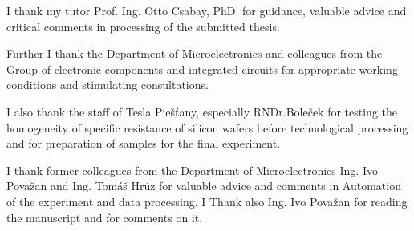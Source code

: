 \iffalse
\par Ďakujem svojmu školiteľovi Prof. Ing. Ottovi Csabayovi, DrSc. za
usmerňovanie, cenné rady a kritické pripomienky pri spracovaní
predloženej kandidátskej práce.
\par Ďakujem ďalej vedeniu Katedry mikroelektroniky a kolegom z
Oddelenia elektronických prvkov a integrovaných obvodov za vytvorené
pracovné podmienky a podnetné konzultácie.
\par Ďakujem tiež pracovníkom Tesly Piešťany, najmä RNDr.Bolečkovi za
otestovanie homogenity špecifického odporu kremíkových dosiek pred
technologickým spracovaním a za prípravu vzoriek pre záverečný
experiment.
\par Ďakujem bývalým pracovníkom Katedry mikroelektroniky
Ing. Ivovi Považanovi a Ing. Tomášovi Hrúzovi za cenné rady a
pripomienky v oblasti automatizácie experimentu a spracovania
dát. Ing.Považanovi ďakujem aj za prečítanie práce a pripomienky k
nej.
\fi

\par
I thank my tutor Prof. Ing. Otto Csabay, PhD. for guidance, valuable
advice and critical comments in processing of the submitted thesis.

\par
Further I thank the Department of Microelectronics and colleagues from
the Group of electronic components and integrated circuits for
appropriate working conditions and stimulating consultations.

\par
I also thank the staff of Tesla Piešťany, especially RNDr.Boleček for
testing the homogeneity of specific resistance of silicon wafers
before technological processing and for preparation of samples for the
final experiment.

\par
I thank former colleagues from the Department of Microelectronics
Ing. Ivo Považan and Ing. Tomáš Hrúz for valuable advice and comments
in Automation of the experiment and data processing. I Thank also
Ing. Ivo Považan for reading the manuscript and for comments on it.
